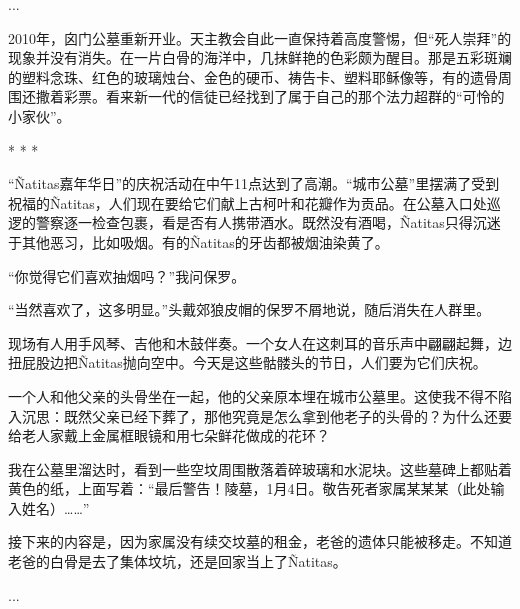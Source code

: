\documentclass[12pt,oneside]{book}
\begin{document}
\begin{bookref}[frametitle={\cite{好好告别：世界葬礼观察手记}}]
...

2010年，囟门公墓重新开业。天主教会自此一直保持着高度警惕，但“死人崇拜”的现象并没有消失。在一片白骨的海洋中，几抹鲜艳的色彩颇为醒目。那是五彩斑斓的塑料念珠、红色的玻璃烛台、金色的硬币、祷告卡、塑料耶稣像等，有的遗骨周围还撒着彩票。看来新一代的信徒已经找到了属于自己的那个法力超群的“可怜的小家伙”。

\begin{center}
* * *
\end{center}

“Ñatitas嘉年华日”的庆祝活动在中午11点达到了高潮。“城市公墓”里摆满了受到祝福的Ñatitas，人们现在要给它们献上古柯叶和花瓣作为贡品。在公墓入口处巡逻的警察逐一检查包裹，看是否有人携带酒水。既然没有酒喝，Ñatitas只得沉迷于其他恶习，比如吸烟。有的Ñatitas的牙齿都被烟油染黄了。

“你觉得它们喜欢抽烟吗？”我问保罗。

“当然喜欢了，这多明显。”头戴郊狼皮帽的保罗不屑地说，随后消失在人群里。

现场有人用手风琴、吉他和木鼓伴奏。一个女人在这刺耳的音乐声中翩翩起舞，边扭屁股边把Ñatitas抛向空中。今天是这些骷髅头的节日，人们要为它们庆祝。

一个人和他父亲的头骨坐在一起，他的父亲原本埋在城市公墓里。这使我不得不陷入沉思：既然父亲已经下葬了，那他究竟是怎么拿到他老子的头骨的？为什么还要给老人家戴上金属框眼镜和用七朵鲜花做成的花环？

我在公墓里溜达时，看到一些空坟周围散落着碎玻璃和水泥块。这些墓碑上都贴着黄色的纸，上面写着：“最后警告！陵墓，1月4日。敬告死者家属某某某（此处输入姓名）……”

接下来的内容是，因为家属没有续交坟墓的租金，老爸的遗体只能被移走。不知道老爸的白骨是去了集体坟坑，还是回家当上了Ñatitas。

...

\end{bookref}
\end{document}
